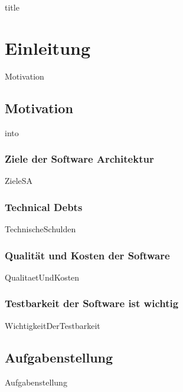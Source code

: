 \documentclass{article}
\begin{document}


{title}

\frontmatter

\tableofcontents

\listoffigures
\listoftables

\mainmatter

\section{Einleitung}
    {Motivation}

    \newpage
    \subsection{Motivation}
        {into}

    \subsubsection{Ziele der Software Architektur}
        {ZieleSA}
    \newpage
    \subsubsection{Technical Debts}
    \label{kap:technicalDebts}
        {TechnischeSchulden}

    \newpage
    \subsubsection{Qualität und Kosten der Software}
        {QualitaetUndKosten}
        
    \subsubsection{Testbarkeit der Software ist wichtig}
        {WichtigkeitDerTestbarkeit}
   
    \newpage

    \subsection{Aufgabenstellung}
    \label{kap:task}
        {Aufgabenstellung}
\end{document}
